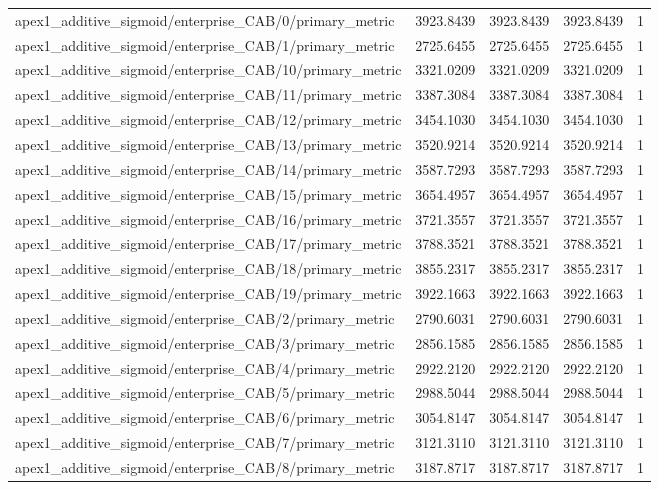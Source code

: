 \begin{table}[h]
\begin{tabular}{lrrrr}
apex1_additive_sigmoid/enterprise_CAB/0/primary_metric & 3923.8439 & 3923.8439 & 3923.8439 & 1 \\
apex1_additive_sigmoid/enterprise_CAB/1/primary_metric & 2725.6455 & 2725.6455 & 2725.6455 & 1 \\
apex1_additive_sigmoid/enterprise_CAB/10/primary_metric & 3321.0209 & 3321.0209 & 3321.0209 & 1 \\
apex1_additive_sigmoid/enterprise_CAB/11/primary_metric & 3387.3084 & 3387.3084 & 3387.3084 & 1 \\
apex1_additive_sigmoid/enterprise_CAB/12/primary_metric & 3454.1030 & 3454.1030 & 3454.1030 & 1 \\
apex1_additive_sigmoid/enterprise_CAB/13/primary_metric & 3520.9214 & 3520.9214 & 3520.9214 & 1 \\
apex1_additive_sigmoid/enterprise_CAB/14/primary_metric & 3587.7293 & 3587.7293 & 3587.7293 & 1 \\
apex1_additive_sigmoid/enterprise_CAB/15/primary_metric & 3654.4957 & 3654.4957 & 3654.4957 & 1 \\
apex1_additive_sigmoid/enterprise_CAB/16/primary_metric & 3721.3557 & 3721.3557 & 3721.3557 & 1 \\
apex1_additive_sigmoid/enterprise_CAB/17/primary_metric & 3788.3521 & 3788.3521 & 3788.3521 & 1 \\
apex1_additive_sigmoid/enterprise_CAB/18/primary_metric & 3855.2317 & 3855.2317 & 3855.2317 & 1 \\
apex1_additive_sigmoid/enterprise_CAB/19/primary_metric & 3922.1663 & 3922.1663 & 3922.1663 & 1 \\
apex1_additive_sigmoid/enterprise_CAB/2/primary_metric & 2790.6031 & 2790.6031 & 2790.6031 & 1 \\
apex1_additive_sigmoid/enterprise_CAB/3/primary_metric & 2856.1585 & 2856.1585 & 2856.1585 & 1 \\
apex1_additive_sigmoid/enterprise_CAB/4/primary_metric & 2922.2120 & 2922.2120 & 2922.2120 & 1 \\
apex1_additive_sigmoid/enterprise_CAB/5/primary_metric & 2988.5044 & 2988.5044 & 2988.5044 & 1 \\
apex1_additive_sigmoid/enterprise_CAB/6/primary_metric & 3054.8147 & 3054.8147 & 3054.8147 & 1 \\
apex1_additive_sigmoid/enterprise_CAB/7/primary_metric & 3121.3110 & 3121.3110 & 3121.3110 & 1 \\
apex1_additive_sigmoid/enterprise_CAB/8/primary_metric & 3187.8717 & 3187.8717 & 3187.8717 & 1 \\

\end{tabular}
\end{table}
